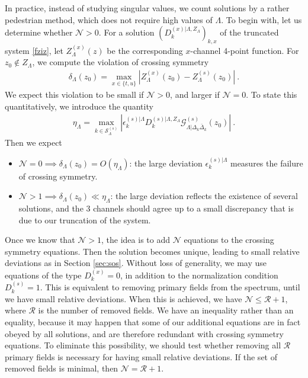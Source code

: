 \documentclass[12pt, a4paper]{article}
\theoremstyle{break}
\begin{document}
In practice, instead of studying singular values, we count solutions by a rather pedestrian method, which does not require high values of $\Lambda$. To begin with, let us determine whether $\mathcal{N}>0$. For a solution $\left(D_k^{(x)|\Lambda,Z_\Lambda}\right)_{k,x}$ of the truncated system \eqref{fziz}, let $Z^{(x)}_\Lambda(z)$ be the corresponding $x$-channel 4-point function. For $z_0\notin Z_\Lambda$, we compute the violation of crossing symmetry 
\begin{align}
 \delta_\Lambda(z_0) = \max_{x\in\{t,u\}} \left|Z^{(x)}_\Lambda(z_0)-Z^{(s)}_\Lambda(z_0)\right|\ . 
\end{align}
We expect this violation to be small if $\mathcal{N}>0$, and larger if $\mathcal{N}=0$. To state this  quantitatively, we introduce the quantity 
\begin{align}
 \eta_\Lambda = \max_{k\in \mathcal{S}_\Lambda^{(s)}} \left|\epsilon_k^{(s)|\Lambda} D_k^{(s)|\Lambda,Z_\Lambda}\mathcal{G}^{(s)}_{\Lambda|\Delta_k\bar\Delta_k}(z_0)\right| \ .
\end{align}
Then we expect
\begin{itemize}
 \item $\mathcal{N}=0\implies \delta_\Lambda(z_0) = O(\eta_\Lambda)$: the large deviation $\epsilon_k^{(s)|\Lambda}$ measures the failure of crossing symmetry.
 \item $\mathcal{N}>1\implies \delta_\Lambda(z_0) \ll \eta_\Lambda$: the large deviation reflects the existence of several solutions, and the 3 channels should agree up to a small discrepancy that is due to our truncation of the system. 
\end{itemize}
Once we know that $\mathcal{N}>1$, the idea is to add $\mathcal{N}$ equations to the crossing symmetry equations. Then the solution becomes unique, leading to small relative deviations as in Section \ref{sec:sos}. Without loss of generality, we may use equations of the type $D^{(x)}_k=0$, in addition to the normalization condition $D^{(s)}_k=1$. This is equivalent to removing primary fields from the spectrum, until we have small relative deviations. When this is achieved, we have $\mathcal{N}\leq \mathcal{R}+1$, where $\mathcal{R}$ is the number of removed fields. We have an inequality rather than an equality, because it may happen that some of our additional equations are in fact obeyed by all solutions, and are therefore redundant with crossing symmetry equations. To eliminate this possibility, we should test whether removing all $\mathcal{R}$ primary fields is necessary for having small relative deviations. If the set of removed fields is minimal, then $\mathcal{N}= \mathcal{R}+1$.
\end{document}
